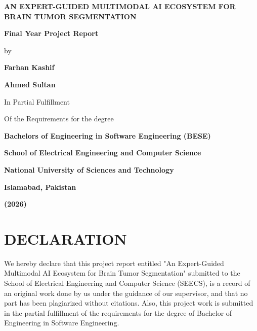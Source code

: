 \documentclass[12pt, a4paper]{report}
\begin{document}
\begin{titlepage}
    \centering
    \vspace*{1in}
    
    {\Huge \bfseries AN EXPERT-GUIDED MULTIMODAL AI ECOSYSTEM FOR BRAIN TUMOR SEGMENTATION\par}
    
    \vspace{1.5in}
    
    {\Large \bfseries Final Year Project Report \par}
    \vspace{0.2in}
    {\large by \par}
    \vspace{0.2in}
    {\large \bfseries Farhan Kashif \par}
    {\large \bfseries Ahmed Sultan \par}
    
    \vspace{1.5in}
    
    {\large In Partial Fulfillment \par}
    {\large Of the Requirements for the degree \par}
    {\large \bfseries Bachelors of Engineering in Software Engineering (BESE) \par}
    
    \vfill
    
    {\large \bfseries School of Electrical Engineering and Computer Science \par}
    {\large \bfseries National University of Sciences and Technology \par}
    {\large \bfseries Islamabad, Pakistan \par}
    {\large \bfseries (2026) \par}
    
\end{titlepage}


\chapter*{DECLARATION}
We hereby declare that this project report entitled "An Expert-Guided Multimodal AI Ecosystem for Brain Tumor Segmentation" submitted to the School of Electrical Engineering and Computer Science (SEECS), is a record of an original work done by us under the guidance of our supervisor, and that no part has been plagiarized without citations. Also, this project work is submitted in the partial fulfillment of the requirements for the degree of Bachelor of Engineering in Software Engineering.
\end{document}
